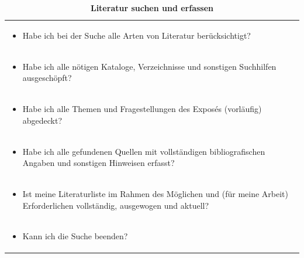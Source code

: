 \documentclass[]{book}
\providecommand{\tightlist}{%
  \setlength{\itemsep}{0pt}\setlength{\parskip}{0pt}}
\theoremstyle{definition}
\theoremstyle{definition}
\theoremstyle{definition}
\theoremstyle{remark}
\begin{document}
\begin{longtable}[]{@{}l@{}}
\caption{\textbf{\label{tab:literatur-erfassen} Literatur suchen und
erfassen}}\tabularnewline
\toprule
\begin{minipage}[t]{0.97\columnwidth}\raggedright\strut
\begin{itemize}
\tightlist
\item
  Habe ich bei der Suche alle Arten von Literatur berücksichtigt?
  \vspace{-6mm}
\end{itemize}\strut
\end{minipage}\tabularnewline
\begin{minipage}[t]{0.97\columnwidth}\raggedright\strut
\begin{itemize}
\tightlist
\item
  Habe ich alle nötigen Kataloge, Verzeichnisse und sonstigen Suchhilfen
  ausgeschöpft? \vspace{-6mm}
\end{itemize}\strut
\end{minipage}\tabularnewline
\begin{minipage}[t]{0.97\columnwidth}\raggedright\strut
\begin{itemize}
\tightlist
\item
  Habe ich alle Themen und Fragestellungen des Exposés (vorläufig)
  abgedeckt? \vspace{-6mm}
\end{itemize}\strut
\end{minipage}\tabularnewline
\begin{minipage}[t]{0.97\columnwidth}\raggedright\strut
\begin{itemize}
\tightlist
\item
  Habe ich alle gefundenen Quellen mit vollständigen bibliografischen
  Angaben und sonstigen Hinweisen erfasst? \vspace{-6mm}
\end{itemize}\strut
\end{minipage}\tabularnewline
\begin{minipage}[t]{0.97\columnwidth}\raggedright\strut
\begin{itemize}
\tightlist
\item
  Ist meine Literaturliste im Rahmen des Möglichen und (für meine
  Arbeit) Erforderlichen vollständig, ausgewogen und aktuell?
  \vspace{-6mm}
\end{itemize}\strut
\end{minipage}\tabularnewline
\begin{minipage}[t]{0.97\columnwidth}\raggedright\strut
\begin{itemize}
\tightlist
\item
  Kann ich die Suche beenden?
\end{itemize}\strut
\end{minipage}\tabularnewline
\bottomrule
\end{longtable}
\end{document}
